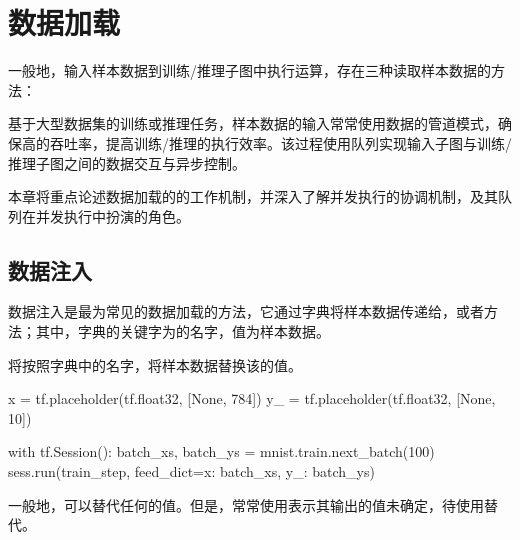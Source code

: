 \begin{savequote}[45mm]
\end{savequote}

\chapter{数据加载} 
\label{ch:input-pipeline}

\begin{content}

一般地，输入样本数据到训练/推理子图中执行运算，存在三种读取样本数据的方法：

\begin{enum}
\end{enum}

基于大型数据集的训练或推理任务，样本数据的输入常常使用数据的管道模式，确保高的吞吐率，提高训练/推理的执行效率。该过程使用队列实现输入子图与训练/推理子图之间的数据交互与异步控制。

本章将重点论述数据加载的的工作机制，并深入了解并发执行的协调机制，及其队列在并发执行中扮演的角色。

\end{content}

\section{数据注入}

\begin{content}

数据注入是最为常见的数据加载的方法，它通过字典将样本数据传递给，或者方法；其中，字典的关键字为的名字，值为样本数据。

将按照字典中的名字，将样本数据替换该的值。

\begin{leftbar}
\begin{python}
x = tf.placeholder(tf.float32, [None, 784])
y_ = tf.placeholder(tf.float32, [None, 10])

with tf.Session():
  batch_xs, batch_ys = mnist.train.next_batch(100)
  sess.run(train_step, feed_dict={x: batch_xs, y_: batch_ys})
\end{python}
\end{leftbar}

一般地，可以替代任何的值。但是，常常使用表示其输出的值未确定，待使用替代。

\end{content}

